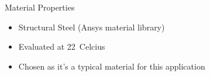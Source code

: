 \documentclass[11pt]{beamer}
\begin{document}



    \begin{frame}{Material Properties}
        \begin{itemize}
            \item Structural Steel (Ansys material library)
            \item Evaluated at 22\textdegree\ Celcius
            \item Chosen as it's a typical material for this application
        \end{itemize}
        \begin{table}
            \caption{Structural Steel Properties}\label{tab:mat}
        \end{table}
    \end{frame}
\end{document}

